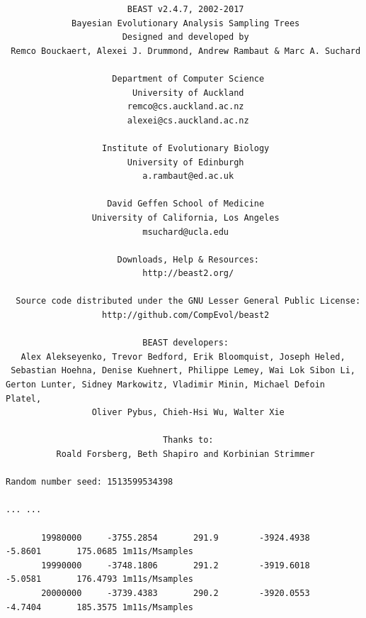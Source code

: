 \documentclass[11pt]{article}
\begin{document}
{\tiny   
\begin{verbatim}
                        BEAST v2.4.7, 2002-2017
             Bayesian Evolutionary Analysis Sampling Trees
                       Designed and developed by
 Remco Bouckaert, Alexei J. Drummond, Andrew Rambaut & Marc A. Suchard
                                    
                     Department of Computer Science
                         University of Auckland
                        remco@cs.auckland.ac.nz
                        alexei@cs.auckland.ac.nz
                                    
                   Institute of Evolutionary Biology
                        University of Edinburgh
                           a.rambaut@ed.ac.uk
                                    
                    David Geffen School of Medicine
                 University of California, Los Angeles
                           msuchard@ucla.edu
                                    
                      Downloads, Help & Resources:
                           http://beast2.org/
                                    
  Source code distributed under the GNU Lesser General Public License:
                   http://github.com/CompEvol/beast2
                                    
                           BEAST developers:
   Alex Alekseyenko, Trevor Bedford, Erik Bloomquist, Joseph Heled, 
 Sebastian Hoehna, Denise Kuehnert, Philippe Lemey, Wai Lok Sibon Li, 
Gerton Lunter, Sidney Markowitz, Vladimir Minin, Michael Defoin Platel, 
                 Oliver Pybus, Chieh-Hsi Wu, Walter Xie
                                    
                               Thanks to:
          Roald Forsberg, Beth Shapiro and Korbinian Strimmer

Random number seed: 1513599534398

... ...

       19980000     -3755.2854       291.9        -3924.4938        -5.8601       175.0685 1m11s/Msamples
       19990000     -3748.1806       291.2        -3919.6018        -5.0581       176.4793 1m11s/Msamples
       20000000     -3739.4383       290.2        -3920.0553        -4.7404       185.3575 1m11s/Msamples


\end{verbatim}}
\end{document}
